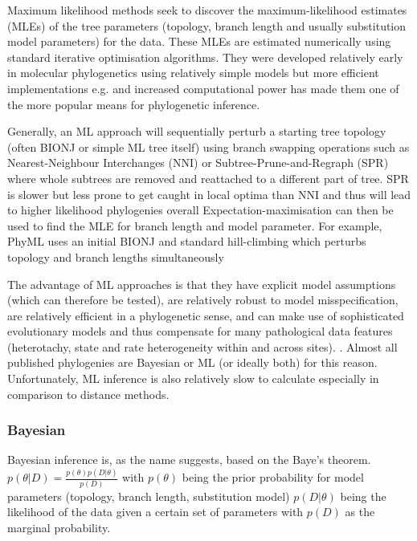 Maximum likelihood methods seek to discover the maximum-likelihood estimates (MLEs) of the tree parameters (topology, branch length and usually substitution model parameters)
for the data. These MLEs are estimated numerically using standard iterative optimisation algorithms.
They were developed relatively early in molecular phylogenetics using relatively
simple models \citep{neyman1971molecular} but more efficient implementations e.g. \citep{Felsenstein1981}
and increased computational power has made them one of the more popular means
for phylogenetic inference.

Generally, an ML approach will sequentially perturb a starting tree topology (often BIONJ or simple ML tree itself) 
using branch swapping operations such as Nearest-Neighbour Interchanges (NNI)
or Subtree-Prune-and-Regraph (SPR) where whole subtrees are removed and reattached to a different part of tree. 
SPR is slower but less prone to get caught in local optima than NNI and thus will
lead to higher likelihood phylogenies overall \citep{Criscuolo2011}
Expectation-maximisation can then be used to find the MLE for branch length and model parameter.
For example, PhyML uses an initial BIONJ and standard hill-climbing which perturbs topology and branch lengths simultaneously 


The advantage of ML approaches is that they have explicit model assumptions (which can therefore be tested), are relatively robust to model
misspecification, are relatively efficient in a phylogenetic sense, and can make use of sophisticated evolutionary models and thus compensate
for many pathological data features (heterotachy, state and rate heterogeneity within and across sites).
\citep{Yang2012}. Almost all published phylogenies are Bayesian or ML (or ideally both) for this reason.
Unfortunately, ML inference is also relatively slow to calculate especially in comparison to distance methods.


\subsubsection{Bayesian}

Bayesian inference is, as the name suggests, based on the Baye's theorem.
\(p(\theta | D) = \frac{p(\theta)p(D|\theta)}{p(D)}\)
with \(p(\theta)\) being the prior probability for model parameters (topology, branch length, substitution model)
\(p(D|\theta)\) being the likelihood of the data given a certain set of parameters with \(p(D)\) as the marginal 
probability.

